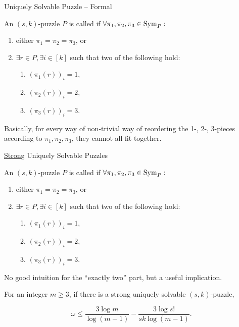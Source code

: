 \documentclass[t,10pt,
mathserif,xcolor=dvipsnames]{beamer}
\begin{document}
\begin{myframe}{Uniquely Solvable Puzzle -- Formal}
  
  \begin{definition}
    An $(s,k)$-puzzle $P$ is called \emph{} if
    $\forall \pi_1, \pi_2, \pi_3 \in \mathrm{Sym}_{P}:$
    \begin{enumerate}
    \item either $\pi_1 = \pi_2 = \pi_3$, or
    \item $\exists r \in P, \exists i \in [k]$ such that  two
      of the following hold:
      \begin{enumerate}
      \item $(\pi_1(r))_i = 1$,
      \item $(\pi_2(r))_i = 2$,
      \item $(\pi_3(r))_i = 3$.
      \end{enumerate}
    \end{enumerate}
    
  \end{definition}

  Basically, for every way of non-trivial way of reordering the 1-,
  2-, 3-pieces according to $\pi_1, \pi_2, \pi_3$, they cannot all fit
  together.
    
  
\end{myframe}

\begin{myframe}{\uline{Strong} Uniquely Solvable Puzzles}

  \begin{definition}

    An $(s,k)$-puzzle $P$ is called \emph{} if
    $\forall \pi_1, \pi_2, \pi_3 \in \mathrm{Sym}_{P}:$
    \begin{enumerate}
    \item either $\pi_1 = \pi_2 = \pi_3$, or
    \item $\exists r \in P, \exists i \in [k]$ such that  two
      of the following hold:
      \begin{enumerate}
      \item $(\pi_1(r))_i = 1$,
      \item $(\pi_2(r))_i = 2$,
      \item $(\pi_3(r))_i = 3$.
      \end{enumerate}
    \end{enumerate}

  \end{definition}

  No good intuition for the ``exactly two'' part, but a useful
  implication.

  \begin{lemma}
    For an integer $m \ge 3$, if there is a strong uniquely solvable
    $(s,k)$-puzzle, 

    $$\omega \le \frac{3 \log m}{\log(m-1)} - \frac{3 \log s!}{sk \log(m-1)}.$$
  \end{lemma}
  
\end{myframe}
\end{document}
